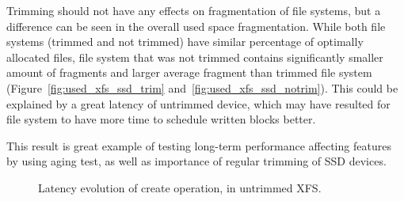 \documentclass[
  color, %
  table, %
  lof,   %
  lot,   %
]{fithesis3}
\begin{document}
Trimming should not have any effects on fragmentation of file systems, but a difference can be seen in the overall used space fragmentation. While both file systems (trimmed and not trimmed) have similar percentage of optimally allocated files, file system that was not trimmed contains significantly smaller amount of fragments and larger average fragment than trimmed file system (Figure~\ref{fig:used_xfs_ssd_trim} and~\ref{fig:used_xfs_ssd_notrim}). This could be explained by a great latency of untrimmed device, which may have resulted for file system to have more time to schedule written blocks better.

This result is great example of testing long-term performance affecting features by using aging test, as well as importance of regular trimming of SSD devices.


\begin{figure}
    \centering
    \caption[Evolution of latency of create operation, in untrimmed file system (XFS)]{Latency evolution of create operation, in untrimmed XFS.}
    \label{fig:notrim_create}
\end{figure}
\end{document}
